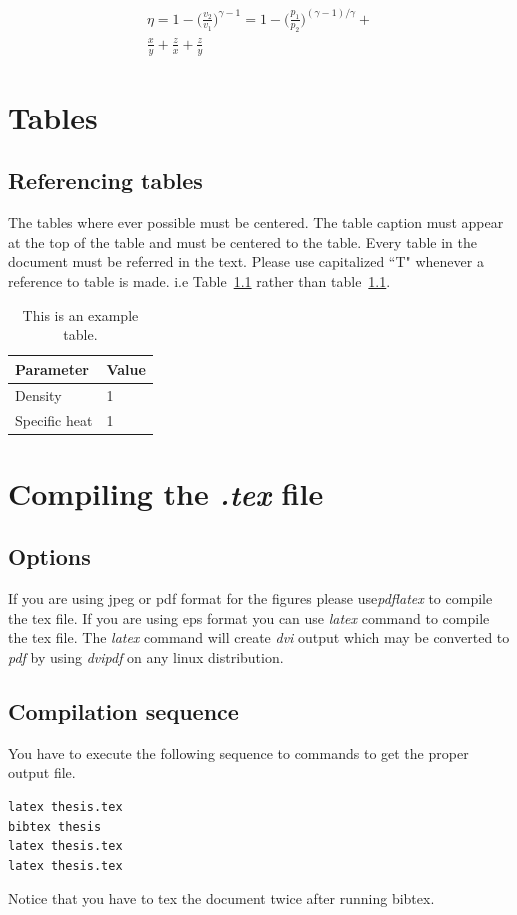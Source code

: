 \documentclass[a4paper,twoside]{iiththesis}
\begin{document}
\begin{flushright}
\begin{eqnarray}
 \eta = 1-\bigg(\frac{v_2}{v_1}\bigg)^{\gamma-1} = 1-\bigg(\frac{p_1}{p_2}\bigg)^{(\gamma-1)/\gamma} + \\ 
 \frac{x}{y} + \frac{z}{x} + \frac{z}{y}
\end{eqnarray}

\end{flushright}


\chapter{Tables}

\section{Referencing tables}
The tables where ever possible must be centered. The table caption must appear at the top of the table and must be centered to the table. Every table in the document must be referred in the text. Please use capitalized ``T" whenever a reference to table is made. i.e Table~\ref{extable} rather than table~\ref{extable}.
\begin{table}[h]
\centering
\caption{This is an example table.}
\begin{tabular}{l l}
\hline
Parameter & Value \\
\hline
Density & 1 \\
Specific heat & 1 \\
\hline
\end{tabular}
\label{extable}
\end{table}

\chapter{Compiling the \textit{.tex} file }
\label{compiling}

\section{Options}
If you are using jpeg or pdf format for the figures please use\textit{pdflatex} to compile the tex file. If you are using eps format you can use \textit{latex} command to compile the tex file. The \textit{latex} command will create \textit{dvi} output which may be converted to \textit{pdf} by using \textit{dvipdf} on any linux distribution. 

\section{Compilation sequence}
You have to execute the following sequence to commands to get the proper output file.
\begin{verbatim}
latex thesis.tex
bibtex thesis
latex thesis.tex
latex thesis.tex
\end{verbatim}
Notice that you have to tex the document twice after running bibtex.\\

\clearpage
\newpage
{} %


\end{document}
